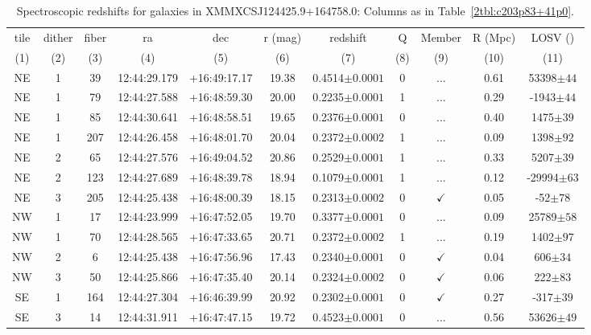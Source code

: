 \begin{landscape}
	\begin{table}
		\centering 
		\caption[Spectroscopic redshifts for galaxies in XMMXCSJ124425.9+164758.0.]{Spectroscopic redshifts for galaxies in XMMXCSJ124425.9+164758.0: Columns as in Table~\ref{2tbl:c203p83+41p0}.}
		\begin{tabular}{ccccccccccc}
			\hline
			tile & dither & fiber & ra & dec & r (mag) & redshift & Q & Member & R (Mpc) & LOSV (\kms) \\
			(1) & (2) & (3) & (4) & (5) & (6) & (7) & (8) & (9) & (10) & (11) \\
			\hline \hline
	NE & 1 & 39 & 12:44:29.179 & +16:49:17.17 & 19.38 & 0.4514$\pm{0.0001}$ & 0 & ... & 0.61 & 53398$\pm{44}$ \\
	NE & 1 & 79 & 12:44:27.588 & +16:48:59.30 & 20.00 & 0.2235$\pm{0.0001}$ & 1 & ... & 0.29 & -1943$\pm{44}$ \\
	NE & 1 & 85 & 12:44:30.641 & +16:48:58.51 & 19.65 & 0.2376$\pm{0.0001}$ & 0 & ... & 0.40 & 1475$\pm{39}$ \\
	NE & 1 & 207 & 12:44:26.458 & +16:48:01.70 & 20.04 & 0.2372$\pm{0.0002}$ & 1 & ... & 0.09 & 1398$\pm{92}$ \\
	NE & 2 & 65 & 12:44:27.576 & +16:49:04.52 & 20.86 & 0.2529$\pm{0.0001}$ & 1 & ... & 0.33 & 5207$\pm{39}$ \\
	NE & 2 & 123 & 12:44:27.689 & +16:48:39.78 & 18.94 & 0.1079$\pm{0.0001}$ & 1 & ... & 0.12 & -29994$\pm{63}$ \\
	NE & 3 & 205 & 12:44:25.438 & +16:48:00.39 & 18.15 & 0.2313$\pm{0.0002}$ & 0 & $\checkmark$ & 0.05 & -52$\pm{78}$ \\
	NW & 1 & 17 & 12:44:23.999 & +16:47:52.05 & 19.70 & 0.3377$\pm{0.0001}$ & 0 & ... & 0.09 & 25789$\pm{58}$ \\
	NW & 1 & 70 & 12:44:28.565 & +16:47:33.65 & 20.71 & 0.2372$\pm{0.0002}$ & 1 & ... & 0.19 & 1402$\pm{97}$ \\
	NW & 2 & 6 & 12:44:25.438 & +16:47:56.96 & 17.43 & 0.2340$\pm{0.0001}$ & 0 & $\checkmark$ & 0.04 & 606$\pm{34}$ \\
	NW & 3 & 50 & 12:44:25.866 & +16:47:35.40 & 20.14 & 0.2324$\pm{0.0002}$ & 0 & $\checkmark$ & 0.06 & 222$\pm{83}$ \\
	SE & 1 & 164 & 12:44:27.304 & +16:46:39.99 & 20.92 & 0.2302$\pm{0.0001}$ & 0 & $\checkmark$ & 0.27 & -317$\pm{39}$ \\
	SE & 3 & 14 & 12:44:31.911 & +16:47:47.15 & 19.72 & 0.4523$\pm{0.0001}$ & 0 & ... & 0.56 & 53626$\pm{49}$ \\

\end{tabular}
\end{table}
\end{landscape}
